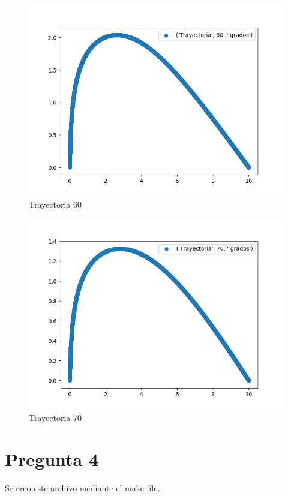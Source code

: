 \documentclass{article}
\begin{document}
\begin{figure}
  \centering
    \includegraphics{('Trayectoria', 60, ' grados').png}
  \caption{Trayectoria 60}
  \label{fig:ejemplo1}
\end{figure}
\begin{figure}
  \centering
    \includegraphics{('Trayectoria', 70, ' grados').png}
  \caption{Trayectoria 70}
  \label{fig:ejemplo1}
\end{figure}
\section{Pregunta 4}
Se creo este archivo mediante el make file.
\end{document}
